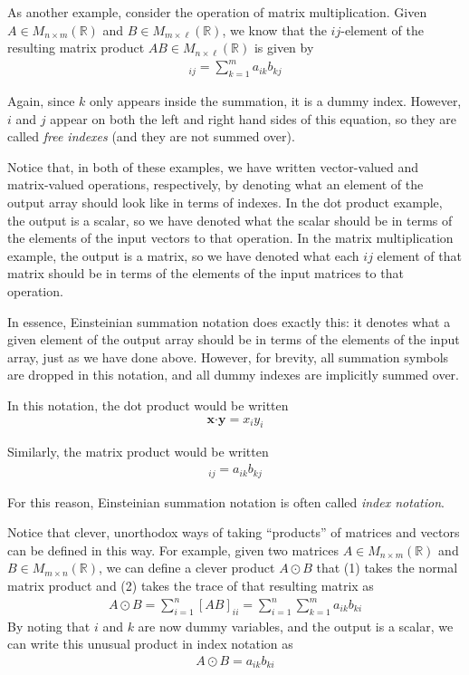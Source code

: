 As another example, consider the operation of matrix multiplication.
Given $A \in M_{n \times m}(\mathbb{R})$ and $B \in M_{m \times \ell} (\mathbb{R})$, we know that the $ij$-element of the resulting matrix product $AB \in M_{n \times \ell}(\mathbb{R})$ is given by
\begin{align*}
[AB]_{ij} = \sum_{k=1}^{m} a_{ik}b_{kj}
\end{align*}

Again, since $k$ only appears inside the summation, it is a dummy index.
However, $i$ and $j$ appear on both the left and right hand sides of this equation, so they are called \emph{free indexes} (and they are not summed over).

Notice that, in both of these examples, we have written vector-valued and matrix-valued operations, respectively, by denoting what an element of the output array should look like in terms of indexes.
In the dot product example, the output is a scalar, so we have denoted what the scalar should be in terms of the elements of the input vectors to that operation.
In the matrix multiplication example, the output is a matrix, so we have denoted what each $ij$ element of that matrix should be in terms of the elements of the input matrices to that operation.

In essence, Einsteinian summation notation does exactly this: it denotes what a given element of the output array should be in terms of the elements of the input array, just as we have done above.
However, for brevity, all summation symbols are dropped in this notation, and all dummy indexes are implicitly summed over.

In this notation, the dot product would be written
\begin{align*}
\mathbf{x} \boldsymbol{\cdot} \mathbf{y} = x_i y_i
\end{align*}

Similarly, the matrix product would be written
\begin{align*}
[AB]_{ij} = a_{ik}b_{kj}
\end{align*}

For this reason, Einsteinian summation notation is often called \emph{index notation}.

Notice that clever, unorthodox ways of taking ``products'' of matrices and vectors can be defined in this way.
For example, given two matrices  $A \in M_{n \times m}(\mathbb{R})$ and $B \in M_{m \times n} (\mathbb{R})$, we can define a clever product $A \odot B$ that (1) takes the normal matrix product and (2) takes the trace of that resulting matrix as
\begin{align*}
A \odot B = \sum_{i=1}^{n}[AB]_{ii} = \sum_{i=1}^{n} \sum_{k=1}^{m} a_{ik} b_{ki}
\end{align*}
By noting that $i$ and $k$ are now dummy variables, and the output is a scalar, we can write this unusual product in index notation as
\begin{align*}
A \odot B = a_{ik} b_{ki}
\end{align*}


